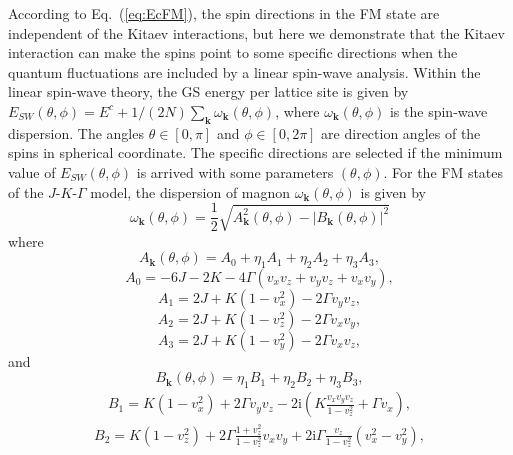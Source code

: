 \documentclass[aps,prb,reprint,amsfonts,amsmath,amssymb,showpacs,groupedaddress,superscriptaddress]{revtex4-1}
\begin{document}
According to Eq.~(\ref{eq:EcFM}), the spin directions in the FM state are independent of the Kitaev interactions, but here we demonstrate that the Kitaev interaction can make the spins point to some specific directions when the quantum fluctuations are included by a linear spin-wave analysis.
Within the linear spin-wave theory, the GS energy per lattice site is given by $E_{SW}(\theta, \phi) = E^{c} + 1/(2N) \sum_{\bm{k}} \omega_{\bm{k}}(\theta, \phi)$, where $\omega_{\bm{k}}(\theta, \phi)$ is the spin-wave dispersion. The angles $\theta \in [0, \pi]$ and $\phi \in [0, 2\pi]$ are direction angles of the spins in spherical coordinate. The specific directions are selected if the minimum value of $E_{SW}(\theta, \phi)$ is arrived with some parameters $(\theta, \phi)$. For the FM states of the $J$-$K$-$\Gamma$ model, the dispersion of magnon $\omega_{\bm{k}}(\theta, \phi)$ is given by
\begin{equation}
    \omega_{\bm{k}}(\theta, \phi)= \frac{1}{2} \sqrt{A_{\bm{k}}^{2}(\theta, \phi) - |B_{\bm{k}}(\theta, \phi)|^{2}}
    \label{eq:LSWDispersion}
\end{equation}
where
\begin{equation}
A_{\bm{k}}(\theta, \phi)=A_{0} + \eta_{1} A_{1} + \eta_{2} A_{2} + \eta_{3} A_{3}, \nonumber
\end{equation}
\begin{equation}
A_{0}=-6J - 2K - 4 \Gamma (v_{x} v_{z} + v_{y} v_{z} + v_{x} v_{y}), \nonumber
\end{equation}
\begin{equation}
A_{1}=2J + K (1-v_{x}^{2}) - 2 \Gamma v_{y} v_{z}, \nonumber
\end{equation}
\begin{equation}
A_{2}=2J + K (1-v_{z}^{2}) - 2 \Gamma v_{x} v_{y}, \nonumber
\end{equation}
\begin{equation}
A_{3}=2J + K (1-v_{y}^{2}) - 2 \Gamma v_{x} v_{z}, \nonumber
\end{equation}
and
\begin{equation}
B_{\bm{k}}(\theta, \phi)=\eta_{1} B_{1} + \eta_{2} B_{2} + \eta_{3} B_{3}, \nonumber
\end{equation}
\begin{align}
B_{1}=K (1 - v_{x}^{2}) + 2\Gamma v_{y} v_{z}- 2\text{i} (K \frac{v_{x} v_{y} v_{z}}{1-v_{z}^{2}} + \Gamma v_{x}), \nonumber
\end{align}
\begin{align}
B_{2}=K (1 - v_{z}^{2}) + 2 \Gamma \frac{1 + v_{z}^{2}}{1 - v_{z}^{2}} v_{x}v_{y}+ 2\text{i} \Gamma \frac{v_{z}}{1 - v_{z}^{2}}(v_{x}^2 - v_{y}^2), \nonumber
\end{align}
\end{document}
